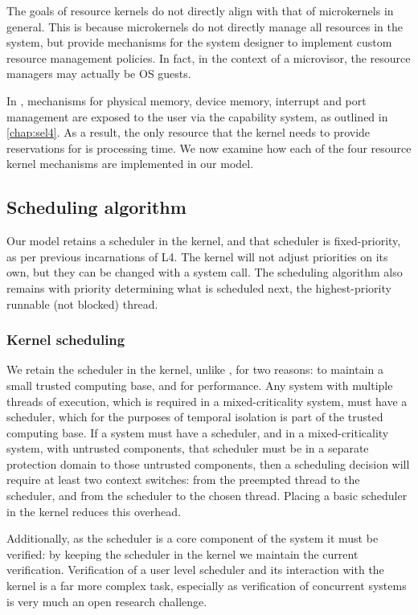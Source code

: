 The goals of resource kernels do not directly align with that of microkernels in general.  This is
because microkernels do not directly manage all resources in the system, but provide mechanisms for
the system designer to implement custom resource management policies.  In fact, in the context of a
microvisor, the resource managers may actually be OS guests.

In \selfour, mechanisms for physical memory, device memory, interrupt and \IO port management are
exposed to the user via the capability system, as outlined in \cref{chap:sel4}. As a result, the
only resource that the kernel needs to provide reservations for is processing time.  We now examine
how each of the four resource kernel mechanisms are implemented in our model.

\subsection{Scheduling algorithm}

Our model retains a scheduler in the kernel, and that scheduler is fixed-priority, as per previous
incarnations of L4. 
The kernel will not adjust priorities on its own, but they can be changed with a
system call. 
The scheduling algorithm also remains with priority determining what is scheduled next, \ie the
highest-priority runnable (not blocked) thread.

\subsubsection{Kernel scheduling}

We retain the scheduler in the kernel, unlike \composite, for two reasons: to maintain a small
trusted computing base, and for performance. Any system with multiple threads of execution, which is
required in a mixed-criticality system, must have a scheduler, which for the purposes of temporal isolation 
is part of the trusted computing base. If a system must have a scheduler, and in a mixed-criticality
system, with untrusted components, that scheduler must be in a separate protection domain to those
untrusted components, then a scheduling decision will require at least two context switches: from
the preempted thread to the scheduler, and from the scheduler to the chosen thread. Placing a basic
scheduler in the kernel reduces this overhead. 

Additionally, as the scheduler is a core component of the system it must be verified: by keeping the
scheduler in the kernel we maintain the current verification. Verification of a user level scheduler
and its interaction with the kernel is a far more complex task, especially as verification of
concurrent systems is very much an open research challenge. 

